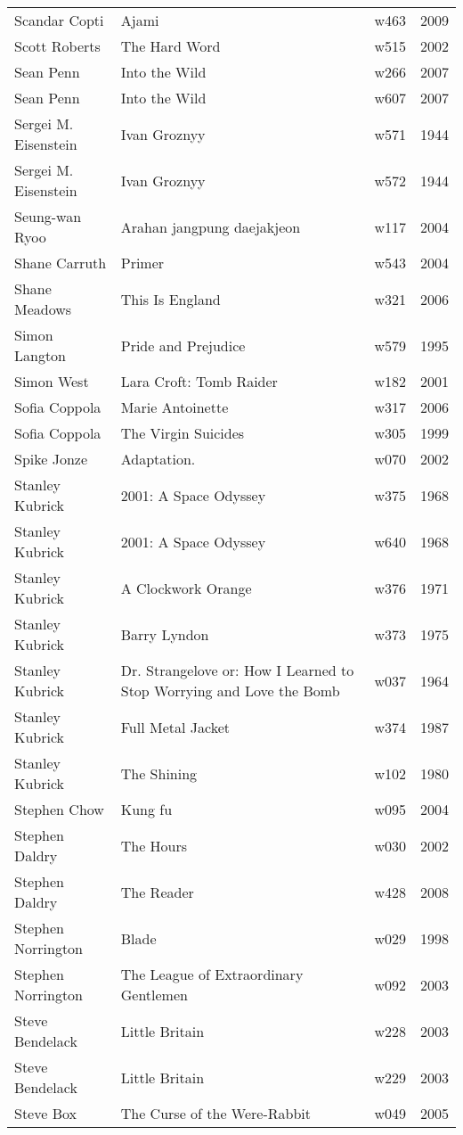 \documentclass{article}
\begin{document}
\begin {center}
\begin{longtable}{l p{10cm} l l}
Scandar Copti & Ajami & w463 & 2009 \\
Scott Roberts & The Hard Word & w515 & 2002 \\
Sean Penn & Into the Wild & w266 & 2007 \\
Sean Penn & Into the Wild & w607 & 2007 \\
Sergei M. Eisenstein & Ivan Groznyy & w571 & 1944 \\
Sergei M. Eisenstein & Ivan Groznyy & w572 & 1944 \\
Seung-wan Ryoo & Arahan jangpung daejakjeon & w117 & 2004 \\
Shane Carruth & Primer & w543 & 2004 \\
Shane Meadows & This Is England & w321 & 2006 \\
Simon Langton & Pride and Prejudice & w579 & 1995 \\
Simon West & Lara Croft: Tomb Raider & w182 & 2001 \\
Sofia Coppola & Marie Antoinette & w317 & 2006 \\
Sofia Coppola & The Virgin Suicides & w305 & 1999 \\
Spike Jonze & Adaptation. & w070 & 2002 \\
Stanley Kubrick & 2001: A Space Odyssey & w375 & 1968 \\
Stanley Kubrick & 2001: A Space Odyssey & w640 & 1968 \\
Stanley Kubrick & A Clockwork Orange & w376 & 1971 \\
Stanley Kubrick & Barry Lyndon & w373 & 1975 \\
Stanley Kubrick & Dr. Strangelove or: How I Learned to Stop Worrying and Love the Bomb & w037 & 1964 \\
Stanley Kubrick & Full Metal Jacket & w374 & 1987 \\
Stanley Kubrick & The Shining & w102 & 1980 \\
Stephen Chow & Kung fu & w095 & 2004 \\
Stephen Daldry & The Hours & w030 & 2002 \\
Stephen Daldry & The Reader & w428 & 2008 \\
Stephen Norrington & Blade & w029 & 1998 \\
Stephen Norrington & The League of Extraordinary Gentlemen & w092 & 2003 \\
Steve Bendelack & Little Britain & w228 & 2003 \\
Steve Bendelack & Little Britain & w229 & 2003 \\
Steve Box & The Curse of the Were-Rabbit & w049 & 2005 \\

\end{longtable}
\end{center}
\end{document}
